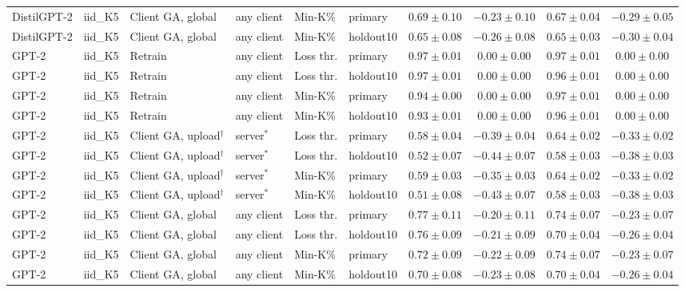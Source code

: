 {\begin{longtable}{@{\extracolsep{\fill}}llllllcccc@{}}
DistilGPT-2 & iid\_K5 & Client GA, global & any client & Min-K\% & primary & $0.69 \pm 0.10$ & $-0.23 \pm 0.10$ & $0.67 \pm 0.04$ & $-0.29 \pm 0.05$ \\
DistilGPT-2 & iid\_K5 & Client GA, global & any client & Min-K\% & holdout10 & $0.65 \pm 0.08$ & $-0.26 \pm 0.08$ & $0.65 \pm 0.03$ & $-0.30 \pm 0.04$ \\
GPT-2 & iid\_K5 & Retrain & any client & Loss thr. & primary & $0.97 \pm 0.01$ & $0.00 \pm 0.00$ & $0.97 \pm 0.01$ & $0.00 \pm 0.00$ \\
GPT-2 & iid\_K5 & Retrain & any client & Loss thr. & holdout10 & $0.97 \pm 0.01$ & $0.00 \pm 0.00$ & $0.96 \pm 0.01$ & $0.00 \pm 0.00$ \\
GPT-2 & iid\_K5 & Retrain & any client & Min-K\% & primary & $0.94 \pm 0.00$ & $0.00 \pm 0.00$ & $0.97 \pm 0.01$ & $0.00 \pm 0.00$ \\
GPT-2 & iid\_K5 & Retrain & any client & Min-K\% & holdout10 & $0.93 \pm 0.01$ & $0.00 \pm 0.00$ & $0.96 \pm 0.01$ & $0.00 \pm 0.00$ \\
GPT-2 & iid\_K5 & Client GA, upload$^{\dagger}$ & server$^{*}$ & Loss thr. & primary & $0.58 \pm 0.04$ & $-0.39 \pm 0.04$ & $0.64 \pm 0.02$ & $-0.33 \pm 0.02$ \\
GPT-2 & iid\_K5 & Client GA, upload$^{\dagger}$ & server$^{*}$ & Loss thr. & holdout10 & $0.52 \pm 0.07$ & $-0.44 \pm 0.07$ & $0.58 \pm 0.03$ & $-0.38 \pm 0.03$ \\
GPT-2 & iid\_K5 & Client GA, upload$^{\dagger}$ & server$^{*}$ & Min-K\% & primary & $0.59 \pm 0.03$ & $-0.35 \pm 0.03$ & $0.64 \pm 0.02$ & $-0.33 \pm 0.02$ \\
GPT-2 & iid\_K5 & Client GA, upload$^{\dagger}$ & server$^{*}$ & Min-K\% & holdout10 & $0.51 \pm 0.08$ & $-0.43 \pm 0.07$ & $0.58 \pm 0.03$ & $-0.38 \pm 0.03$ \\
GPT-2 & iid\_K5 & Client GA, global & any client & Loss thr. & primary & $0.77 \pm 0.11$ & $-0.20 \pm 0.11$ & $0.74 \pm 0.07$ & $-0.23 \pm 0.07$ \\
GPT-2 & iid\_K5 & Client GA, global & any client & Loss thr. & holdout10 & $0.76 \pm 0.09$ & $-0.21 \pm 0.09$ & $0.70 \pm 0.04$ & $-0.26 \pm 0.04$ \\
GPT-2 & iid\_K5 & Client GA, global & any client & Min-K\% & primary & $0.72 \pm 0.09$ & $-0.22 \pm 0.09$ & $0.74 \pm 0.07$ & $-0.23 \pm 0.07$ \\
GPT-2 & iid\_K5 & Client GA, global & any client & Min-K\% & holdout10 & $0.70 \pm 0.08$ & $-0.23 \pm 0.08$ & $0.70 \pm 0.04$ & $-0.26 \pm 0.04$ \\

\end{longtable}}
